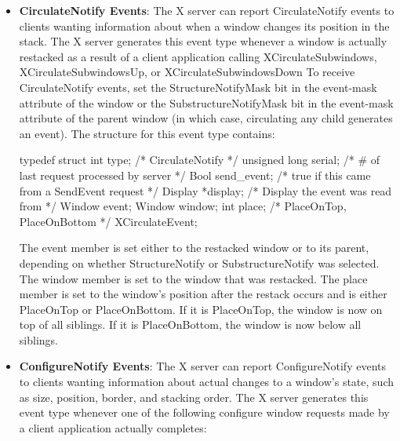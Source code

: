 \documentclass{report}
\begin{document}
\begin{itemize}
\begin{itemize}
                \item GravityNotify events
                \item MapNotify events
                \item MappingNotify events
                \item ReparentNotify events
                \item UnmapNotify events
                \item VisibilityNotify events
            \end{itemize}
        \item \textbf{CirculateNotify Events}: The X server can report CirculateNotify events to clients wanting information about when a window changes its position in the stack. The X server generates this event type whenever a window is actually restacked as a result of a client application calling XCirculateSubwindows, XCirculateSubwindowsUp, or XCirculateSubwindowsDown
            \bigbreak \noindent 
            To receive CirculateNotify events, set the StructureNotifyMask bit in the event-mask attribute of the window or the SubstructureNotifyMask bit in the event-mask attribute of the parent window (in which case, circulating any child generates an event).
            \bigbreak \noindent 
            The structure for this event type contains:
            \bigbreak \noindent 
            \begin{cppcode}
                typedef struct {
                    int type;               /* CirculateNotify */
                    unsigned long serial;   /* # of last request processed by server */
                    Bool send_event;        /* true if this came from a SendEvent request */
                    Display *display;       /* Display the event was read from */
                    Window event;
                    Window window;
                    int place;              /* PlaceOnTop, PlaceOnBottom */
                } XCirculateEvent;
            \end{cppcode}
            \bigbreak \noindent 
            The event member is set either to the restacked window or to its parent, depending on whether StructureNotify or SubstructureNotify was selected. The window member is set to the window that was restacked. The place member is set to the window’s position after the restack occurs and is either PlaceOnTop or PlaceOnBottom. If it is PlaceOnTop, the window is now on top of all siblings. If it is PlaceOnBottom, the window is now below all siblings.
        \item \textbf{ConfigureNotify Events}: The X server can report ConfigureNotify events to clients wanting information about actual changes to a window’s state, such as size, position, border, and stacking order. The X server generates this event type whenever one of the following configure window requests made by a client application actually completes:

\end{itemize}
\end{document}
